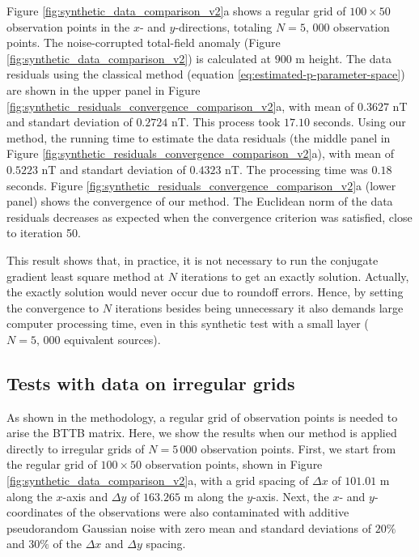 
Figure \ref{fig:synthetic_data_comparison_v2}a shows a regular grid of  $100 \times 50$ observation points in the $x$- and $y$-directions, totaling  $N = 5,\, 000$ observation points. 
The noise-corrupted total-field anomaly (Figure \ref{fig:synthetic_data_comparison_v2}) is calculated at $900$ m height. 
The data residuals using the classical method (equation \ref{eq:estimated-p-parameter-space}) are shown in the upper panel in Figure \ref{fig:synthetic_residuals_convergence_comparison_v2}a, 
with mean of $0.3627$ nT and standart deviation of $0.2724$ nT.
This process took $17.10$ seconds.
Using our method, the running time to estimate the data residuals (the middle panel in Figure \ref{fig:synthetic_residuals_convergence_comparison_v2}a), with mean of $0.5223$ nT and standart deviation of $0.4323$ nT. The processing time was $0.18$ seconds.
Figure \ref{fig:synthetic_residuals_convergence_comparison_v2}a (lower panel) shows the convergence of our method. The Euclidean norm of the data residuals decreases as expected when the
convergence criterion was satisfied, close to iteration 50. 

This result shows that, in practice, it is not necessary to run the conjugate gradient least square method at $N$ iterations to get an exactly solution.
Actually, the exactly solution  would never occur due to roundoff errors.
Hence, by setting the convergence to  $N$ iterations besides being unnecessary it also demands large computer processing time, even in this synthetic test with a small layer 
($N = 5,\, 000$ equivalent sources). 

\subsection*{Tests with data on irregular grids}

As shown in the methodology, a regular grid of observation points is needed to arise the BTTB matrix. 
Here, we show the results when our method is applied directly to irregular grids of $N = 5 \, 000$ observation points. 
First, we start from the  regular grid of $100 \times 50$ observation points, shown in Figure 
\ref{fig:synthetic_data_comparison_v2}a,  with a grid spacing of $\Delta x$ of $101.01$ m along the $x$-axis and $\Delta y$ of $163.265$ m along the $y$-axis. 
Next, the $x$- and $y$-coordinates of the observations were also contaminated with additive pseudorandom Gaussian noise with zero mean and standard deviations of $20\%$ and $30\%$ of the $\Delta x$ and $\Delta y$ spacing.

